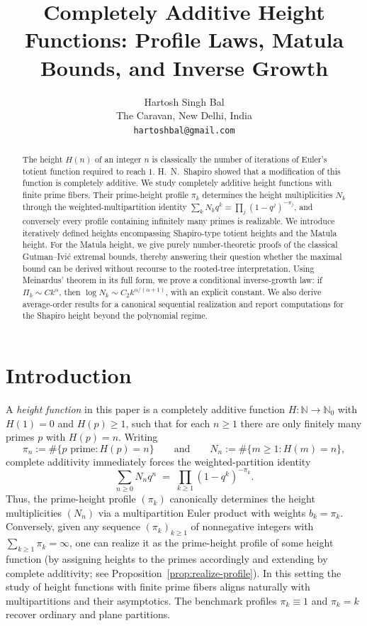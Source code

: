 \documentclass[11pt]{article}
\title{Completely Additive Height Functions: Profile Laws, Matula Bounds, and Inverse Growth}
\author{Hartosh Singh Bal\\
\small The Caravan, New Delhi, India\\
\small\texttt{hartoshbal@gmail.com}}
\date{}
\theoremstyle{definition}
\begin{document}
\maketitle

\begin{abstract}
The height $H(n)$ of an integer $n$ is classically the number of iterations of
Euler's totient function required to reach $1$. H.~N.~Shapiro showed that a
modification of this function is completely additive.  We study completely
additive height functions with finite prime fibers.  Their prime-height profile
$\pi_k$ determines the height multiplicities $N_k$ through the
weighted-multipartition identity
$\sum_k N_k q^k=\prod_j(1-q^j)^{-\pi_j}$, and conversely every profile
containing infinitely many primes is realizable.  We introduce iteratively
defined heights encompassing Shapiro-type totient heights and the Matula height.
For the Matula height, we give purely number-theoretic proofs of the classical Gutman–Ivić extremal bounds, thereby answering their question whether the maximal bound can be derived without recourse to the rooted-tree interpretation.  Using Meinardus' theorem in its full form, we prove a
conditional inverse-growth law: if $\Pi_k\sim Ck^\alpha$, then
$\log N_k\sim C_2 k^{\alpha/(\alpha+1)}$, with an explicit constant.  We also
derive average-order results for a canonical sequential realization and report
computations for the Shapiro height beyond the polynomial regime.
\end{abstract}

\section{Introduction}

A \emph{height function} in this paper is a completely additive function
$H:\mathbb{N}\to\mathbb{N}_0$ with $H(1)=0$ and $H(p) \ge 1$, such that for each $n\ge1$ there
are only finitely many primes $p$ with $H(p)=n$.
Writing
\[
  \pi_n := \#\{p\text{ prime}: H(p)=n\}
  \qquad\text{and}\qquad
  N_n := \#\{m\ge1:H(m)=n\},
\]
complete additivity immediately forces the weighted-partition identity
\[
  \sum_{n\ge0} N_n q^n
  \;=\;
  \prod_{k\ge1} (1-q^k)^{-\pi_k}.
\]
Thus, the prime-height profile $(\pi_k)$ canonically determines the height
multiplicities $(N_n)$ via a multipartition Euler product with weights
$b_k=\pi_k$.  Conversely, given any sequence $(\pi_k)_{k\ge1}$ of nonnegative
integers with $\sum_{k\ge1}\pi_k=\infty$, one can realize it as the prime-height
profile of some height function (by assigning heights to the primes accordingly
and extending by complete additivity; see Proposition~\ref{prop:realize-profile}).
In this setting the study of height functions with finite prime fibers aligns
naturally with multipartitions and their asymptotics.  The benchmark profiles
$\pi_k\equiv 1$ and $\pi_k=k$ recover ordinary and plane partitions.
\end{document}
